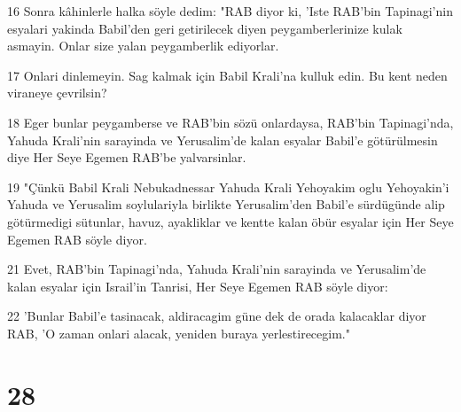 \par 16 Sonra kâhinlerle halka söyle dedim: "RAB diyor ki, 'Iste RAB'bin Tapinagi'nin esyalari yakinda Babil'den geri getirilecek diyen peygamberlerinize kulak asmayin. Onlar size yalan peygamberlik ediyorlar.
\par 17 Onlari dinlemeyin. Sag kalmak için Babil Krali'na kulluk edin. Bu kent neden viraneye çevrilsin?
\par 18 Eger bunlar peygamberse ve RAB'bin sözü onlardaysa, RAB'bin Tapinagi'nda, Yahuda Krali'nin sarayinda ve Yerusalim'de kalan esyalar Babil'e götürülmesin diye Her Seye Egemen RAB'be yalvarsinlar.
\par 19 "Çünkü Babil Krali Nebukadnessar Yahuda Krali Yehoyakim oglu Yehoyakin'i Yahuda ve Yerusalim soylulariyla birlikte Yerusalim'den Babil'e sürdügünde alip götürmedigi sütunlar, havuz, ayakliklar ve kentte kalan öbür esyalar için Her Seye Egemen RAB söyle diyor.
\par 21 Evet, RAB'bin Tapinagi'nda, Yahuda Krali'nin sarayinda ve Yerusalim'de kalan esyalar için Israil'in Tanrisi, Her Seye Egemen RAB söyle diyor:
\par 22 'Bunlar Babil'e tasinacak, aldiracagim güne dek de orada kalacaklar diyor RAB, 'O zaman onlari alacak, yeniden buraya yerlestirecegim."

\chapter{28}

